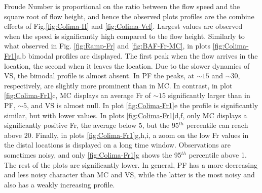 \documentclass{article}
\begin{document}
Froude Number is proportional on the ratio between the flow speed and the square root of flow height, and hence the observed plots profiles are the combine effects of Fig.\ref{fig:Colima-H}  and \ref{fig:Colima-Vel}. Largest values are observed when the speed is significantly high compared to the flow height. Similarly to what observed in Fig. \ref{fig:Ramp-Fr} and \ref{fig:BAF-Fr-MC}, in plots \ref{fig:Colima-Fr1}a,b bimodal profiles are displayed. The first peak when the flow arrives in the location, the second when it leaves the location. Due to the slower dynamics of VS, the bimodal profile is almost absent. In PF the peaks, at $\sim 15$ and $\sim 30$, respectively, are slightly more prominent than in MC. In contrast, in plot \ref{fig:Colima-Fr1}c, MC displays an average Fr of $\sim 15$ significantly larger than in PF, $\sim 5$, and VS is almost null. In plot \ref{fig:Colima-Fr1}e the profile is significantly similar, but with lower values. In plots \ref{fig:Colima-Fr1}d,f, only MC displays a significantly positive Fr, the average below $5$, but the 95$^{th}$ percentile can reach above $20$. Finally, in plots \ref{fig:Colima-Fr1}g,h,i, a zoom on the low Fr values in the distal locations is displayed on a long time window. Observations are sometimes noisy, and only \ref{fig:Colima-Fr1}g shows the 95$^{th}$ percentile above 1. The rest of the plots are significantly lower. In general, PF has a more decreasing and less noisy character than MC and VS, while the latter is the most noisy and also has a weakly increasing profile.
\end{document}
